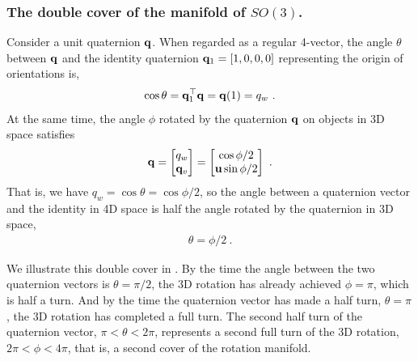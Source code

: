 \subsubsection{The double cover of the manifold of $SO(3)$.}
\label{sec:double_cover}

Consider a unit quaternion ${\bf q}$. When regarded as a regular 4-vector, the angle $\theta$ between ${\bf q}$ and the identity quaternion ${\bf q}_1=[1,0,0,0]$ representing the origin of orientations is,
%
\begin{align}
\cos\theta = {\bf q}_1^{\top}{\bf q} = {\bf q}(1) = q_w
~.
\end{align}
%
At the same time, the angle $\phi$ rotated by the quaternion ${\bf q}$ on objects in 3D space satisfies
%
\begin{align}
{\bf q} = \begin{bmatrix}
q_w \\ {\bf q}_v
\end{bmatrix} = \begin{bmatrix}
\cos\phi/2 \\ {\bf u}\sin\phi/2
\end{bmatrix}
~.
\end{align}
%
That is, we have $q_w = \cos\theta = \cos\phi/2$, 
so the angle between a quaternion vector and the identity in 4D space is half the angle rotated by the quaternion in 3D space,
%
\begin{align}
\theta = \phi/2
~.
\end{align}

We illustrate this double cover in . 
By the time the angle between the two quaternion vectors is $\theta=\pi/2$, the 3D rotation has already achieved $\phi=\pi$, which is half a turn. 
And by the time the quaternion vector has made a half turn, $\theta=\pi$, the 3D rotation has completed a full turn. 
The second half turn of the quaternion vector, $\pi<\theta<2\pi$, represents a second full turn of the 3D rotation, $2\pi<\phi<4\pi$, that is, a second cover of the rotation manifold.

